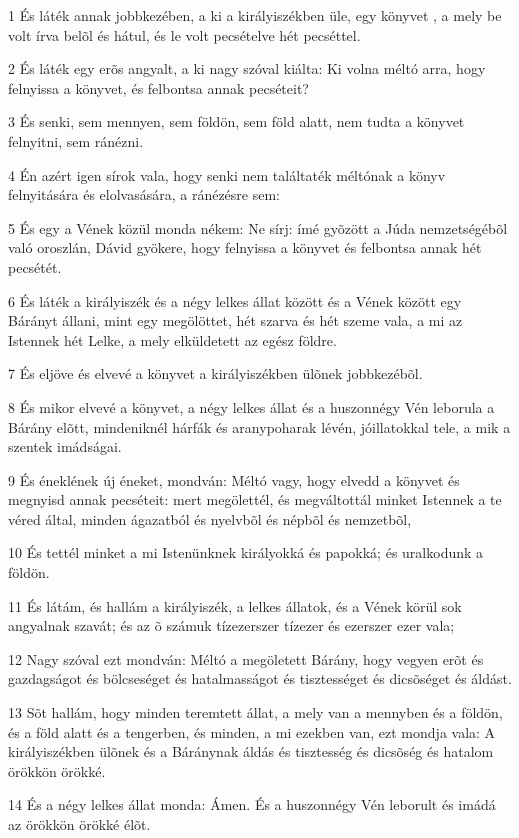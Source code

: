 \par 1 És láték annak jobbkezében, a ki a királyiszékben üle, egy könyvet  , a mely be volt írva belõl és hátul, és le volt pecsételve hét pecséttel.
\par 2 És láték egy erõs angyalt, a ki nagy szóval kiálta: Ki volna méltó arra, hogy felnyissa a könyvet, és felbontsa annak pecséteit?
\par 3 És senki, sem mennyen, sem földön, sem föld alatt, nem tudta a könyvet felnyitni, sem ránézni.
\par 4 Én azért igen sírok vala, hogy senki nem találtaték méltónak a könyv felnyitására és elolvasására, a ránézésre sem:
\par 5 És egy a Vének közül monda nékem: Ne sírj: ímé gyõzött a Júda nemzetségébõl való oroszlán,  Dávid gyökere, hogy felnyissa a könyvet és felbontsa annak hét pecsétét.
\par 6 És láték a királyiszék és a négy lelkes állat között és a Vének között egy Bárányt állani, mint egy megölöttet, hét szarva és  hét szeme vala, a mi az Istennek hét Lelke, a mely elküldetett az egész földre.
\par 7 És eljöve és elvevé a könyvet a királyiszékben ülõnek jobbkezébõl.
\par 8 És mikor elvevé a könyvet, a négy lelkes állat és a huszonnégy Vén leborula a Bárány elõtt, mindeniknél hárfák és aranypoharak lévén, jóillatokkal tele, a mik a szentek  imádságai.
\par 9 És éneklének új éneket, mondván: Méltó vagy, hogy elvedd a könyvet és megnyisd annak pecséteit: mert megölettél, és megváltottál minket  Istennek a te véred által, minden ágazatból és nyelvbõl és népbõl és nemzetbõl,
\par 10 És tettél minket a mi Istenünknek királyokká és papokká; és uralkodunk a földön.
\par 11 És látám, és hallám a királyiszék, a lelkes állatok, és a Vének körül sok angyalnak szavát; és az õ számuk tízezerszer  tízezer és ezerszer ezer vala;
\par 12 Nagy szóval ezt mondván: Méltó a megöletett Bárány, hogy vegyen erõt és gazdagságot és bölcseséget és hatalmasságot és tisztességet és dicsõséget és áldást.
\par 13 Sõt hallám, hogy minden teremtett állat, a mely van a mennyben és a földön, és a föld alatt és a tengerben, és minden, a mi ezekben van, ezt mondja vala: A királyiszékben  ülõnek és a Báránynak áldás és tisztesség és dicsõség és hatalom örökkön örökké.
\par 14 És a négy lelkes állat monda: Ámen. És a huszonnégy Vén  leborult és imádá az örökkön örökké élõt.

